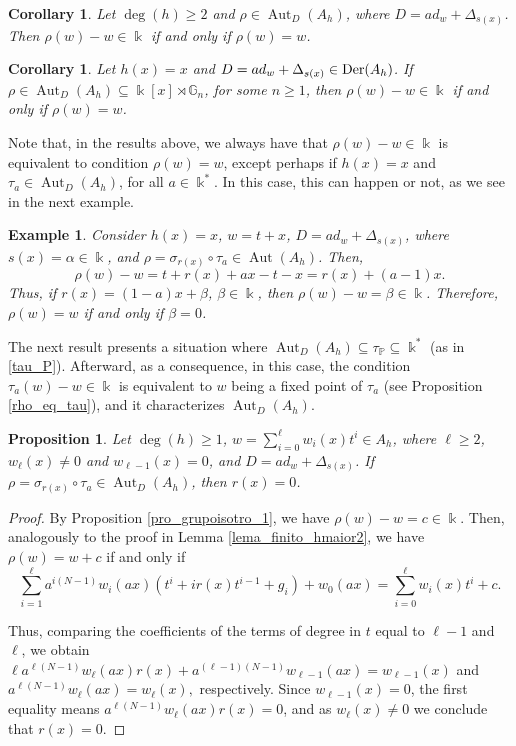 \documentclass{article}
\numberwithin{equation}{section}\theoremstyle{plain}
\newtheorem{corollary}[theorem]{Corollary}
\newtheorem{proposition}[theorem]{Proposition}
\newtheorem{example}[theorem]{Example}
\newcommand{\der}{{\rm Der}}
\DeclareMathOperator{\Aut}{Aut}
\begin{document}
\begin{corollary}
Let $\deg(h)\geq 2$ and $\rho \in \Aut_D(A_h)$, where $D=ad_w+\Delta_{s(x)}$.
Then $\rho(w)-w\in \Bbbk$ if and only if $\rho(w) = w$.
\end{corollary}

\begin{corollary}
Let $h(x)=x$ and $D=ad_w+\Delta_{s(x)} \in \der(A_h)$. 
If $\rho \in \Aut_D(A_h) \subseteq \Bbbk[x] \rtimes \mathbb{G}_n$, for some $n \geq 1$, then  $\rho(w)-w\in \Bbbk$ if and only if $\rho(w) = w$.
\end{corollary}

 Note that, in the results above, we always have that $\rho(w)-w\in\Bbbk$ is equivalent to condition $\rho(w)=w$, except perhaps if $h(x)=x$ and $\tau_a \in \Aut_D(A_h)$, for all $a \in \Bbbk^\ast$.
In this case, this can happen or not, as we see in the next example.

\begin{example}
   Consider $h(x)=x$, $w=t+x$, $D=ad_w+\Delta_{s(x)}$, where $s(x)=
   \alpha\in\Bbbk$, and
$\rho=\sigma_{r(x)}\circ\tau_a\in \Aut(A_h)$.
Then,
$$\rho(w)-w=t+r(x)+ax-t-x=r(x)+(a-1)x.$$
Thus, if $r(x)=(1-a)x+\beta$, $\beta\in\Bbbk$, then $\rho(w)-w = \beta \in\Bbbk$.
Therefore, $\rho(w) = w$ if and only if $\beta =0$. 
\end{example}

The next result presents a situation where $\Aut_D(A_h) \subseteq \tau_{\mathbb{P}} \subseteq \Bbbk^\ast$ (as in \eqref{tau_P}).
Afterward, as a consequence, in this case, the condition $\tau_a(w)-w \in \Bbbk$ is equivalent to $w$ being a fixed point of $\tau_a$ (see Proposition \ref{rho_eq_tau}), and it characterizes $\Aut_D(A_h)$.
  



\begin{proposition}\label{prop_rx_zero}
  Let $\deg(h)\geq 1$, $w=\sum_{i=0}^\ell w_i(x)t^i\in A_h$, where $\ell \geq 2$, $w_\ell (x) \neq 0$ and $w_{\ell-1} (x) = 0$,  and $D=ad_w + \Delta_{s(x)}$.
    If $\rho = \sigma_{r(x)} \circ \tau_a \in \Aut_D(A_h)$, then $r(x)=0$.
\end{proposition}
\begin{proof}
    By Proposition \ref{pro_grupoisotro_1}, we have $\rho(w)-w=c\in \Bbbk$. Then, analogously to the proof in Lemma \ref{lema_finito_hmaior2}, we have 
    $\rho(w)=w+c$ if and only if
    \begin{equation*}
 \sum_{i=1}^\ell a^{i(N-1)}w_i(ax)(t^i+ir(x)t^{i-1}+g_i)+w_0(ax) =\sum_{i=0}^\ell w_i(x)t^i+c.
    \end{equation*}

Thus, comparing the coefficients of the terms of degree in $t$ equal to $\ell-1$ and $\ell$, we obtain
$\ell a^{\ell(N-1)}w_\ell (ax)r(x)+a^{(\ell-1)(N-1)}w_{\ell-1}(ax)=w_{\ell-1}(x)$
and 
$a^{\ell(N-1)}w_\ell(ax)=w_\ell(x),$ respectively. 
Since $w_{\ell-1}(x)=0$, the first equality means $a^{\ell(N-1)}w_\ell(ax)r(x)=0$, and
 as $w_\ell(x) \neq 0$ we conclude that $r(x)=0$.
\end{proof}
\end{document}
